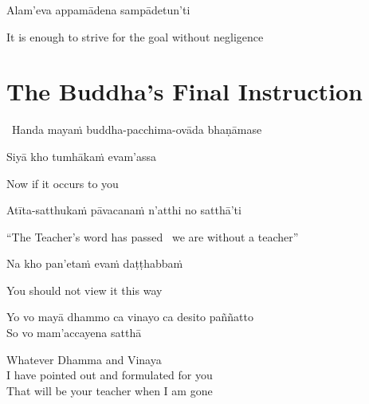 Alam'eva appamādena sampādetun'ti\makeatletter\hyperlink{endnote93-appendix}\makeatother

\begin{english}
  It is enough to strive for the goal without negligence
\end{english}

\suttaRef{[SN 12.22]}


\section{The Buddha's Final Instruction}
\label{buddhas-final-instruction}

\begin{leader}
  \anglebracketleft\ \hspace{-0.5mm}Handa mayaṁ buddha-pacchima-ovāda bhaṇāmase \hspace{-0.5mm}\anglebracketright\
\end{leader}

Siyā kho tumhākaṁ evam'assa

\begin{english}
  Now if it occurs to you
\end{english}

Atīta-satthukaṁ pāvacanaṁ n'atthi no satthā'ti

\begin{english}
  ``The Teacher's word has passed \breathmark\ we are without a teacher''
\end{english}

Na kho pan'etaṁ evaṁ daṭṭhabbaṁ

\begin{english}
  You should not view it this way
\end{english}

Yo vo mayā dhammo ca vinayo ca desito paññatto\\
So vo mam'accayena satthā

\begin{english-verses}
  Whatever Dhamma and Vinaya\\
  I have pointed out and formulated for you\\
  That will be your teacher when I am gone
\end{english-verses}

